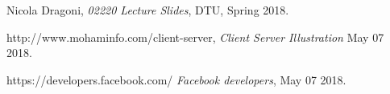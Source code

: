 \begin{thebibliography}{5}
    Nicola Dragoni,
    \textit{02220 Lecture Slides},
    DTU, Spring 2018.

    http://www.mohaminfo.com/client-server,
    \textit{Client Server Illustration}
    May 07 2018.

    https://developers.facebook.com/
    \textit{Facebook developers},
    May 07 2018.
    
\end{thebibliography}
